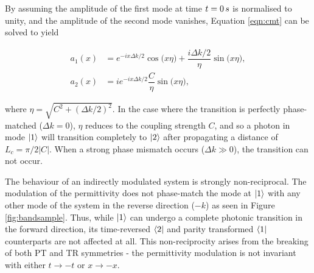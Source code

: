 By assuming the amplitude of the first mode at time $t=0 \mskip3mu s$ is normalised to unity, and the amplitude of the second mode vanishes, Equation \ref{eqn:cmt} can be solved to yield

\begin{align}
	a_1(x) &= e^{-i x \Delta k /2} \cos\big(x \eta \big) + \dfrac{i \Delta k /2}{\eta} \sin\big(x \eta \big), \\
	a_2(x) &= i e^{-i x \Delta k /2}\dfrac{C}{\eta} \sin\big(x \eta \big),
	\label{eqn:theorymode}
\end{align}

where $\eta = \sqrt{C^2 + (\Delta k / 2)^2}$. In the case where the transition is perfectly phase-matched ($\Delta k = 0$), $\eta$ reduces to the coupling strength $C$, and so a photon in mode $\ket{1}$ will transition completely to $\ket{2}$ after propagating a distance of $L_c = \pi / 2|C|$. When a strong phase mismatch occurs ($\Delta k \gg 0$), the transition can not occur.

The behaviour of an indirectly modulated system is strongly non-reciprocal. The modulation of the permittivity does not phase-match the mode at $\ket{1}$ with any other mode of the system in the reverse direction ($-k$) as seen in Figure \ref{fig:bandsample}. Thus, while $\ket{1}$ can undergo a complete photonic transition in the forward direction, its time-reversed $\bra{2}$ and parity transformed  $\bra{1}$ counterparts are not affected at all. This non-reciprocity arises from the breaking of both PT and TR symmetries - the permittivity modulation is not invariant with either $t \rightarrow -t$ or $x \rightarrow -x$.


